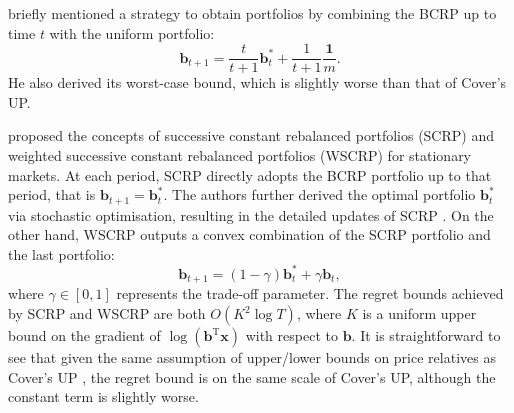 \citet[Chapter~4.4]{ordentlich96} briefly mentioned a strategy to obtain portfolios by combining the BCRP up to time $t$ with the uniform portfolio:
\begin{equation}
	\mathbf{b}_{t+1}
	= \frac{t}{t+1}\mathbf{b}_{t}^* + \frac{1}{t+1}\frac{\mathbf{1}}{m}.
\end{equation}
He also derived its worst-case bound, which is slightly worse than that of Cover's UP.

\citet{gaivoronski00} proposed the concepts of successive constant rebalanced portfolios (SCRP) and weighted successive constant rebalanced portfolios (WSCRP) for stationary markets. At each period, SCRP directly adopts the BCRP portfolio up to that period, that is $\mathbf{b}_{t+1} = \mathbf{b}_{t}^*$. The authors further derived the optimal portfolio $\mathbf{b}_{t}^*$ via stochastic optimisation, resulting in the detailed updates of SCRP \citep[Algorithm~1]{gaivoronski00}. On the other hand, WSCRP outputs a convex combination of the SCRP portfolio and the last portfolio:
\begin{equation}
	\mathbf{b}_{t+1}
	= (1-\gamma) \mathbf{b}_{t}^* + \gamma \mathbf{b}_{t},
\end{equation}
where $\gamma \in [0, 1]$ represents the trade-off parameter. The regret bounds achieved by SCRP \citep[Theorem~1]{gaivoronski00} and WSCRP \citep[Theorem~4]{gaivoronski00} are both $O(K^{2}\log T)$, where $K$ is a uniform upper bound on the gradient of $\log(\mathbf{b}^\text{T}\mathbf{x})$ with respect to $\mathbf{b}$. It is straightforward to see that given the same assumption of upper/lower bounds on price relatives as Cover's UP \citep[Theorem~6.1]{cover}, the regret bound is on the same scale of Cover's UP, although the constant term is slightly worse.

